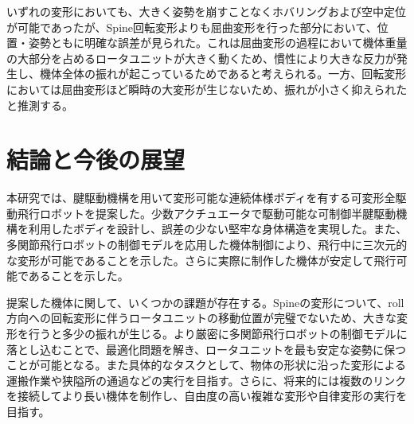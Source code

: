 \documentclass{jarticle}
\begin{document}
いずれの変形においても、大きく姿勢を崩すことなくホバリングおよび空中定位が可能であったが、Spine回転変形よりも屈曲変形を行った部分において、位置・姿勢ともに明確な誤差が見られた。これは屈曲変形の過程において機体重量の大部分を占めるロータユニットが大きく動くため、慣性により大きな反力が発生し、機体全体の振れが起こっているためであると考えられる。一方、回転変形においては屈曲変形ほど瞬時の大変形が生じないため、振れが小さく抑えられたと推測する。
\section{結論と今後の展望}
本研究では、腱駆動機構を用いて変形可能な連続体様ボディを有する可変形全駆動飛行ロボットを提案した。少数アクチュエータで駆動可能な可制御半腱駆動機構を利用したボディを設計し、誤差の少ない堅牢な身体構造を実現した。また、多関節飛行ロボットの制御モデルを応用した機体制御により、飛行中に三次元的な変形が可能であることを示した。さらに実際に制作した機体が安定して飛行可能であることを示した。

提案した機体に関して、いくつかの課題が存在する。Spineの変形について、roll方向への回転変形に伴うロータユニットの移動位置が完璧でないため、大きな変形を行うと多少の振れが生じる。より厳密に多関節飛行ロボットの制御モデルに落とし込むことで、最適化問題を解き、ロータユニットを最も安定な姿勢に保つことが可能となる。また具体的なタスクとして、物体の形状に沿った変形による運搬作業や狭隘所の通過などの実行を目指す。さらに、将来的には複数のリンクを接続してより長い機体を制作し、自由度の高い複雑な変形や自律変形の実行を目指す。

\footnotesize





\normalsize
\end{document}

